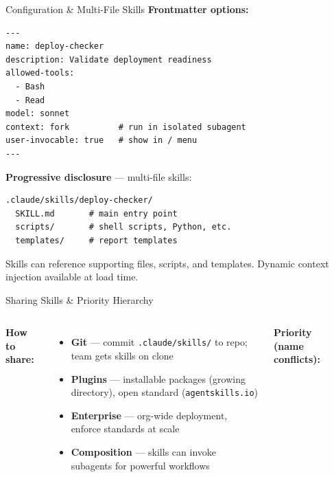 \documentclass[aspectratio=169]{beamer}
\begin{document}
\begin{frame}[fragile]{Configuration \& Multi-File Skills}
\textbf{Frontmatter options:}
\begin{lstlisting}[]
---
name: deploy-checker
description: Validate deployment readiness
allowed-tools:
  - Bash
  - Read
model: sonnet
context: fork          # run in isolated subagent
user-invocable: true   # show in / menu
---
\end{lstlisting}
\smallskip
\textbf{Progressive disclosure} --- multi-file skills:
\begin{lstlisting}
.claude/skills/deploy-checker/
  SKILL.md       # main entry point
  scripts/       # shell scripts, Python, etc.
  templates/     # report templates
\end{lstlisting}

\footnotesize
Skills can reference supporting files, scripts, and templates. Dynamic context injection available at load time.
\end{frame}

\begin{frame}{Sharing Skills \& Priority Hierarchy}
\begin{columns}[T]
\textbf{How to share:}
\begin{itemize}
  \item \textbf{\color{popblue}Git} --- commit \texttt{.claude/skills/} to repo; team gets skills on clone
  \item \textbf{\color{violet1}Plugins} --- installable packages (growing directory), open standard (\texttt{agentskills.io})
  \item \textbf{\color{paramgreen}Enterprise} --- org-wide deployment, enforce standards at scale
  \item \textbf{\color{orange1}Composition} --- skills can invoke subagents for powerful workflows
\end{itemize}

\textbf{Priority (name conflicts):}
\begin{center}
\end{center}
\end{columns}
\end{frame}
\end{document}
